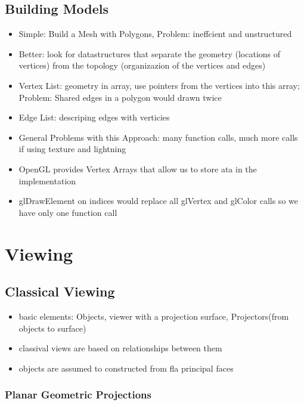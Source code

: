 \documentclass[11pt,a4paper]{article}
\begin{document}
	\subsection{Building Models}
	\begin{itemize}
		\item Simple: Build a Mesh with Polygons, Problem: ineffcient and unstructured
		\item Better: look for datastructures that separate the geometry (locations of vertices) from the topology (organizazion of the vertices and edges)
		\item Vertex List: geometry in array, use pointers from the vertices into this array; Problem: Shared edges in a polygon would drawn twice
		\item Edge List: descriping edges with verticies
		\item General Problems with this Approach: many function calls, much more calls if using texture and lightning
		\item OpenGL provides Vertex Arrays that allow us to store ata in the implementation 
		\item glDrawElement on indices would replace all glVertex and glColor calls so we have only one function call
	\end{itemize}
\section{Viewing}
	 \subsection{Classical Viewing}
	\begin{itemize}
		\item basic elements: Objects, viewer with a projection surface, Projectors(from objects to surface)
		\item classival views are based on relationships between them
		\item objects are assumed to constructed from fla principal faces
	\end{itemize}
	\subsubsection{Planar Geometric Projections}
\end{document}
